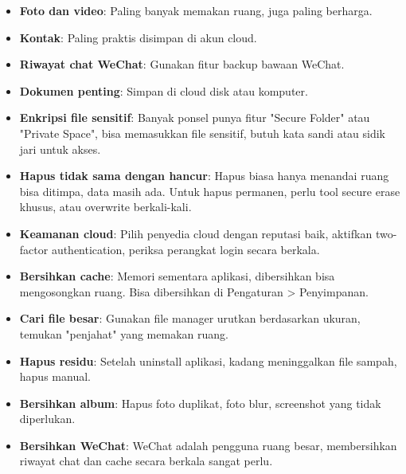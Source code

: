 \begin{itemize}
  \item \textbf{Foto dan video}: Paling banyak memakan ruang, juga paling berharga.
  \item \textbf{Kontak}: Paling praktis disimpan di akun cloud.
  \item \textbf{Riwayat chat WeChat}: Gunakan fitur backup bawaan WeChat.
  \item \textbf{Dokumen penting}: Simpan di cloud disk atau komputer.
\end{itemize}


\begin{itemize}
  \item \textbf{Enkripsi file sensitif}: Banyak ponsel punya fitur "Secure Folder" atau "Private Space", bisa memasukkan file sensitif, butuh kata sandi atau sidik jari untuk akses.
  \item \textbf{Hapus tidak sama dengan hancur}: Hapus biasa hanya menandai ruang bisa ditimpa, data masih ada. Untuk hapus permanen, perlu tool secure erase khusus, atau overwrite berkali-kali.
  \item \textbf{Keamanan cloud}: Pilih penyedia cloud dengan reputasi baik, aktifkan two-factor authentication, periksa perangkat login secara berkala.
\end{itemize}


\begin{itemize}
  \item \textbf{Bersihkan cache}: Memori sementara aplikasi, dibersihkan bisa mengosongkan ruang. Bisa dibersihkan di Pengaturan > Penyimpanan.
  \item \textbf{Cari file besar}: Gunakan file manager urutkan berdasarkan ukuran, temukan "penjahat" yang memakan ruang.
  \item \textbf{Hapus residu}: Setelah uninstall aplikasi, kadang meninggalkan file sampah, hapus manual.
  \item \textbf{Bersihkan album}: Hapus foto duplikat, foto blur, screenshot yang tidak diperlukan.
  \item \textbf{Bersihkan WeChat}: WeChat adalah pengguna ruang besar, membersihkan riwayat chat dan cache secara berkala sangat perlu.
\end{itemize}


